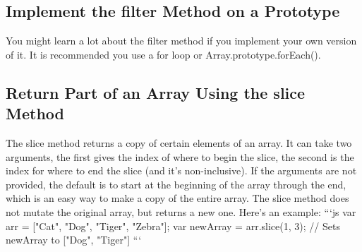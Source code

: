 \documentclass{article}%
\begin{document}
%
\subsection{Implement the filter Method on a Prototype}%
\label{subsec:ImplementthefilterMethodonaPrototype}%
You might learn a lot about the filter method if you implement your own version of it. It is recommended you use a for loop or Array.prototype.forEach().\newline%

%
\subsection{Return Part of an Array Using the slice Method}%
\label{subsec:ReturnPartofanArrayUsingthesliceMethod}%
The slice method returns a copy of certain elements of an array. It can take two arguments, the first gives the index of where to begin the slice, the second is the index for where to end the slice (and it's non{-}inclusive). If the arguments are not provided, the default is to start at the beginning of the array through the end, which is an easy way to make a copy of the entire array. The slice method does not mutate the original array, but returns a new one.\newline%
Here's an example:\newline%
```js\newline%
var arr = {[}"Cat", "Dog", "Tiger", "Zebra"{]};\newline%
var newArray = arr.slice(1, 3);\newline%
// Sets newArray to {[}"Dog", "Tiger"{]}\newline%
```\newline%

%
\end{document}
